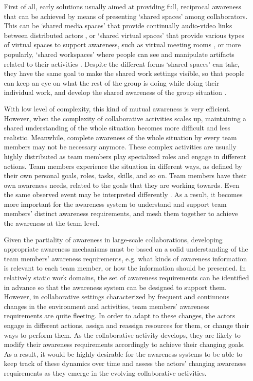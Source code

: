 First of all, early solutions usually aimed at providing full, reciprocal awareness that can be achieved by means of presenting `shared spaces' among collaborators. This can be `shared media spaces' that provide continually audio-video links between distributed actors \cite{Dourish1992}, or `shared virtual spaces' that provide various types of virtual spaces to support awareness, such as virtual meeting rooms \cite{Berlage1999}, or more popularly, `shared workspaces' where people can see and manipulate artifacts related to their activities \cite{Gutwin2002}. Despite the different forms `shared spaces' can take, they have the same goal to make the shared work settings visible, so that people can keep an eye on what the rest of the group is doing while doing their individual work, and develop the shared awareness of the group situation \cite{schmidt2002a}.

With low level of complexity, this kind of mutual awareness is very efficient. However, when the complexity of collaborative activities scales up, maintaining a shared understanding of the whole situation becomes more difficult and less realistic. Meanwhile, complete awareness of the whole situation by every team members may not be necessary anymore. These complex activities are usually highly distributed as team members play specialized roles and engage in different actions. Team members experience the situation in different ways, as defined by their own personal goals, roles, tasks, skills, and so on. Team members have their own awareness needs, related to the goals that they are working towards. Even the same observed event may be interpreted differently \cite{Salmon2010}. As a result, it becomes more important for the awareness system to understand and support team members' distinct awareness requirements, and mesh them together to achieve the awareness at the team level. 

Given the partiality of awareness in large-scale collaborations, developing appropriate awareness mechanisms must be based on a solid understanding of the team members' awareness requirements, e.g. what kinds of awareness information is relevant to each team member, or how the information should be presented. In relatively static work domains, the set of awareness requirements can be identified in advance so that the awareness system can be designed to support them. However, in collaborative settings characterized by frequent and continuous changes in the environment and activities, team members' awareness requirements are quite fleeting. In order to adapt to these changes, the actors engage in different actions, assign and reassign resources for them, or change their ways to perform them. As the collaborative activity develops, they are likely to modify their awareness requirements accordingly to achieve their changing goals. As a result, it would be highly desirable for the awareness systems to be able to keep track of these dynamics over time and assess the actors' changing awareness requirements as they emerge in the evolving collaborative activities.

